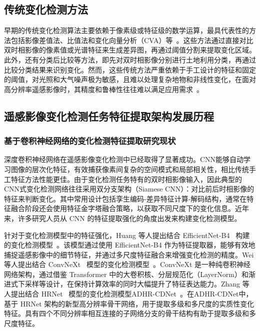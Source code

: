 \subsection{传统变化检测方法}
早期的传统变化检测算法主要依赖于像素级或特征级的数学运算，最具代表性的方法包括影像差值法、比值法和变化向量分析（CVA）等~\cite{YGXB201203010}。这些方法通过直接对比双时相影像的像素值或光谱特征来生成差异图，再通过阈值分割来提取变化区域。此外，还有分类后比较等方法，即先对双时相影像分别进行土地利用分类，再通过比较分类结果来识别变化。然而，这些传统方法严重依赖于手工设计的特征和固定的阈值，对光照和大气噪声极为敏感，且难以处理复杂地物和非线性变化，在面对高分辨率遥感影像时，其精度和鲁棒性往往难以满足应用需求~\cite{Peng2025DeepLC,Ding2025ASO}。

\subsection{遥感影像变化检测任务特征提取架构发展历程}

\subsubsection{基于卷积神经网络的变化检测特征提取研究现状}
深度卷积神经网络在遥感影像变化检测中已经取得了显著成功。CNN能够自动学习图像的层次化特征，有效捕获像素间复杂的空间模式和局部相关性，相比传统手工特征方法性能更佳。由于变化检测任务特有的双时相影像输入，因此典型的CNN式变化检测网络往往采用双分支架构（Siamese CNN）：对比前后时相影像的特征来判断变化。其中常用设计包括孪生编码-差异特征计算-解码结构，通常在特征融合阶段还会使用特征金字塔融合策略，以获取不同尺度下的变化信息。近年来，许多研究人员从 CNN 的特征提取强化的角度出发来构建变化检测模型。

针对于变化检测模型中的特征强化，Huang 等人提出结合 EfficientNet-B4~\cite{tan_efficientnet_2019} 构建的变化检测模型~\cite{Huang_RemoteSens_2023_v15_p3972}。该模型通过使用 EfficientNet-B4 作为特征提取器，能够有效地捕捉遥感影像中的细节特征，并通过多尺度特征融合来增强变化检测的精度。Wei 等人提出结合 ConvNeXt~\cite{Liu2022ACF} 模型的变化检测模型~\cite{wei_robust_2024}。ConvNeXt 是一种纯卷积神经网络架构，通过借鉴 Transformer 中的大卷积核、分层规范化（LayerNorm）和渐进式下采样等设计，在保持计算效率的同时大幅提升了特征表达能力。Zhang 等人提出结合 HRNet~\cite{Wang2019DeepHR} 模型的变化检测模型ADHR-CDNet~\cite{Zhang2022ADHRCDNetAD}。在ADHR-CDNet中，基于 HRNet 架构的新型高分辨率骨干网络，用于提取多级和多尺度的实质性变化特征。具有四个不同分辨率相互连接的子网络分支的骨干结构有助于提取多级和多尺度特征。

